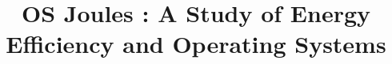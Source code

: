 \usepackage{usenix}
\usepackage{graphics}
\usepackage{cleveref}
\usepackage{titling}
\usepackage{trackchanges}
\usepackage{subcaption}
\usepackage{tikz}
\usepackage{amsmath}
\usepackage{abstract}
\usepackage{adjcalc}
\usepackage{adjustbox}
\usepackage{breakurl}
\usepackage{collectbox}
\usepackage{couriers}
\usepackage{etoolbox}
\usepackage{flushend}
\usepackage{hyphenat}
\usepackage{multirow}
\usepackage{SIunits}
\usepackage{wrapfig}
\usepackage{float}
\usepackage{multirow}
\usepackage{xargs}     %
\usepackage{xcolor}  %
% 
\usepackage[]{todonotes}
\usepackage{cleveref}



\date{}
\title{\Large \bf OS Joules : A Study of Energy Efficiency and Operating
Systems}


\maketitle

